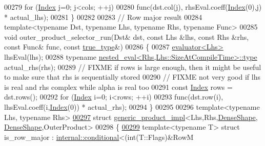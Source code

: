 \begin{DoxyCode}
00279   \textcolor{keywordflow}{for} (\hyperlink{namespace_eigen_a62e77e0933482dafde8fe197d9a2cfde}{Index} j=0; j<cols; ++j)
00280     func(dst.col(j), rhsEval.coeff(\hyperlink{namespace_eigen_a62e77e0933482dafde8fe197d9a2cfde}{Index}(0),j) * actual\_lhs);
00281 \}
00282 
00283 \textcolor{comment}{// Row major result}
00284 \textcolor{keyword}{template}<\textcolor{keyword}{typename} Dst, \textcolor{keyword}{typename} Lhs, \textcolor{keyword}{typename} Rhs, \textcolor{keyword}{typename} Func>
00285 \textcolor{keywordtype}{void} outer\_product\_selector\_run(Dst& dst, \textcolor{keyword}{const} Lhs &lhs, \textcolor{keyword}{const} Rhs &rhs, \textcolor{keyword}{const} Func& func, \textcolor{keyword}{const} 
      \hyperlink{struct_eigen_1_1internal_1_1true__type}{true\_type}&)
00286 \{
00287   \hyperlink{struct_eigen_1_1internal_1_1evaluator}{evaluator<Lhs>} lhsEval(lhs);
00288   \textcolor{keyword}{typename} \hyperlink{class_eigen_1_1internal_1_1_tensor_lazy_evaluator_writable}{nested\_eval<Rhs,Lhs::SizeAtCompileTime>::type} 
      actual\_rhs(rhs);
00289   \textcolor{comment}{// FIXME if rows is large enough, then it might be useful to make sure that rhs is sequentially stored}
00290   \textcolor{comment}{// FIXME not very good if lhs is real and rhs complex while alpha is real too}
00291   \textcolor{keyword}{const} \hyperlink{namespace_eigen_a62e77e0933482dafde8fe197d9a2cfde}{Index} rows = dst.rows();
00292   \textcolor{keywordflow}{for} (\hyperlink{namespace_eigen_a62e77e0933482dafde8fe197d9a2cfde}{Index} i=0; i<rows; ++i)
00293     func(dst.row(i), lhsEval.coeff(i,\hyperlink{namespace_eigen_a62e77e0933482dafde8fe197d9a2cfde}{Index}(0)) * actual\_rhs);
00294 \}
00295 
00296 \textcolor{keyword}{template}<\textcolor{keyword}{typename} Lhs, \textcolor{keyword}{typename} Rhs>
\hyperlink{struct_eigen_1_1internal_1_1generic__product__impl_3_01_lhs_00_01_rhs_00_01_dense_shape_00_01_debd2b837cb01a8b00d65645ba310ac12a}{00297} \textcolor{keyword}{struct }\hyperlink{struct_eigen_1_1internal_1_1generic__product__impl}{generic\_product\_impl}<Lhs,Rhs,\hyperlink{struct_eigen_1_1_dense_shape}{DenseShape},
      \hyperlink{struct_eigen_1_1_dense_shape}{DenseShape},OuterProduct>
00298 \{
\hyperlink{struct_eigen_1_1internal_1_1generic__product__impl_3_01_lhs_00_01_rhs_00_01_dense_shape_00_01_deb11e8f3beed15984390667915ab7b26a}{00299}   \textcolor{keyword}{template}<\textcolor{keyword}{typename} T> \textcolor{keyword}{struct }is\_row\_major : \hyperlink{struct_eigen_1_1internal_1_1conditional}{internal::conditional}<(int(T::Flags)&RowM

\end{DoxyCode}
